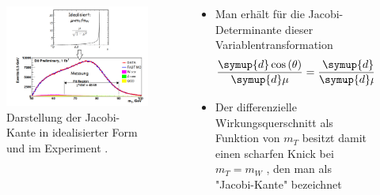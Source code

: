 \documentclass[aspectratio=1610, 9pt]{beamer}
\begin{document}
\begin{frame}
  \begin{columns}
    \begin{column}{0.5\textwidth}
      \begin{figure}
        \includegraphics[width=\textwidth]{images/jacobi-peak.png}
        \caption{Darstellung der Jacobi-Kante in idealisierter Form und im Experiment \cite{vorlesung}.}
      \end{figure}
    \end{column}
    \begin{column}{0.4\textwidth}
      \begin{itemize}
        \item Man erhält für die Jacobi-Determinante dieser Variablentransformation
        \begin{equation*}
          \frac{\symup{d} \cos{(\theta)}}{\symup{d} \mu} = \frac{\symup{d}}{\symup{d}\mu} \sqrt{1-\mu^2} = - \frac{\mu}{\sqrt{1-\mu^2}}
        \end{equation*}
        \item Der differenzielle Wirkungsquerschnitt als Funktion von $m_T$ besitzt damit einen scharfen Knick bei $m_T = m_W$ , den man als "Jacobi-Kante" bezeichnet
      \end{itemize}
    \end{column}
  \end{columns}
\end{frame}
\end{document}
